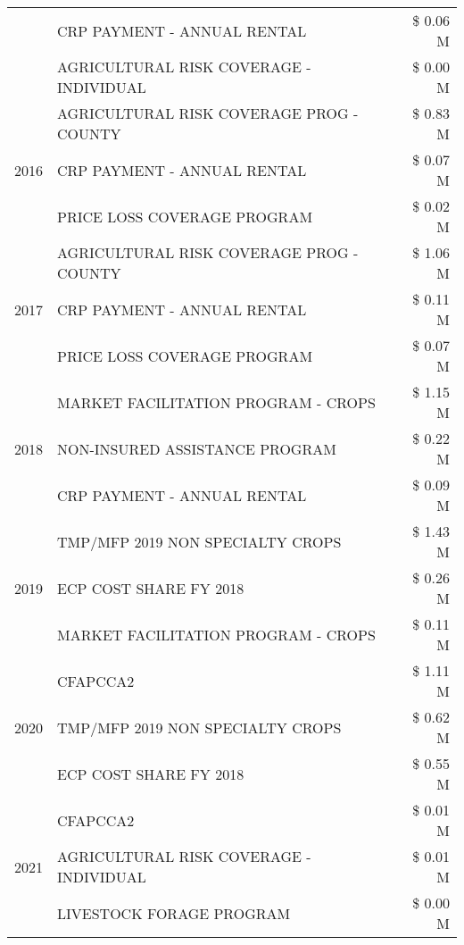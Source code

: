 \begin{tabular}{llr}
 & CRP PAYMENT - ANNUAL RENTAL & \$ 0.06 M \\
 & AGRICULTURAL RISK COVERAGE - INDIVIDUAL & \$ 0.00 M \\
\cline{1-3}
\multirow[t]{3}{*}{2016} & AGRICULTURAL RISK COVERAGE PROG - COUNTY & \$ 0.83 M \\
 & CRP PAYMENT - ANNUAL RENTAL & \$ 0.07 M \\
 & PRICE LOSS COVERAGE PROGRAM & \$ 0.02 M \\
\cline{1-3}
\multirow[t]{3}{*}{2017} & AGRICULTURAL RISK COVERAGE PROG - COUNTY & \$ 1.06 M \\
 & CRP PAYMENT - ANNUAL RENTAL & \$ 0.11 M \\
 & PRICE LOSS COVERAGE PROGRAM & \$ 0.07 M \\
\cline{1-3}
\multirow[t]{3}{*}{2018} & MARKET FACILITATION PROGRAM - CROPS & \$ 1.15 M \\
 & NON-INSURED ASSISTANCE PROGRAM & \$ 0.22 M \\
 & CRP PAYMENT - ANNUAL RENTAL & \$ 0.09 M \\
\cline{1-3}
\multirow[t]{3}{*}{2019} & TMP/MFP 2019 NON SPECIALTY CROPS & \$ 1.43 M \\
 & ECP COST SHARE FY 2018 & \$ 0.26 M \\
 & MARKET FACILITATION PROGRAM - CROPS & \$ 0.11 M \\
\cline{1-3}
\multirow[t]{3}{*}{2020} & CFAPCCA2 & \$ 1.11 M \\
 & TMP/MFP 2019 NON SPECIALTY CROPS & \$ 0.62 M \\
 & ECP COST SHARE FY 2018 & \$ 0.55 M \\
\cline{1-3}
\multirow[t]{3}{*}{2021} & CFAPCCA2 & \$ 0.01 M \\
 & AGRICULTURAL RISK COVERAGE - INDIVIDUAL & \$ 0.01 M \\
 & LIVESTOCK FORAGE PROGRAM & \$ 0.00 M \\
\cline{1-3}
\bottomrule
\end{tabular}

